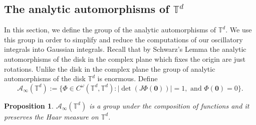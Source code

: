 \documentclass[10pt]{amsart}
\theoremstyle{plain}
\theoremstyle{plain}
\newtheorem{proposition}[theorem]{Proposition}
\newtheorem{lemma}[theorem]{Lemma}
\renewcommand{\vec}[1]{\mathbf{#1}}
\theoremstyle{remark}
\theoremstyle{definition}
\newcommand{\Ki}{K_\infty}
\newcommand{\GL}{\textup{GL}}
\newcommand{\FF}{\mathbb{F}}
\newcommand{\TT}{\mathbb{T}}
\newcommand{\cA}{\mathcal{A}}
\newcommand{\cO}{\mathcal{O}}
\begin{document}
\subsection{The analytic automorphisms of $\TT^d$ }
In this section, we define the group of the analytic automorphisms of $\TT^d.$ We use this group in order to simplify and reduce the computations of our oscillatory integrals into Gaussian integrals. Recall that by  Schwarz's Lemma the analytic automorphisms  of the disk in the complex plane  which fixes the origin are just rotations. Unlike the disk in the complex plane the group of analytic automorphisms of the disk $\TT^d$ is enormous.  Define
\[
\cA_{\infty}(\TT^d):=\big\{\Phi\in C^{\omega}(\TT^d,\TT^d): |\det (J\Phi(\vec{0})) |=1,  \text{ and }  \Phi(\vec{0})=0   \big\}.
\]
\begin{proposition}\label{auto}
$\cA_{\infty}(\TT^d)$ is a group under the composition of functions and it preserves the Haar measure on $\TT^d$. 
\end{proposition}
%
\end{document}
